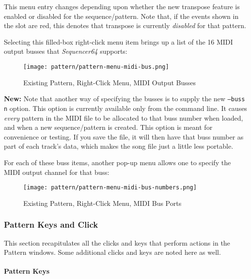    This menu entry changes depending upon whether the new transpose feature is
   enabled or disabled for the sequence/pattern.  Note that, if the events
   shown in the slot are red, this denotes that transpose is currently
   \textsl{disabled} for that pattern.

   Selecting this filled-box right-click menu item brings up a list
   of the 16 MIDI output busses that \textsl{Sequencer64} supports:

\begin{figure}[H]
   \centering 
   \texttt{[image: pattern/pattern-menu-midi-bus.png]}
   \caption{Existing Pattern, Right-Click Menu, MIDI Output Busses}
   \label{fig:pattern_window_right_click_midi_bus}
\end{figure}

   \textbf{New:}
   Note that another way of specifying the busses is to supply the
   new \texttt{--buss n} option.  This option is currently available
   only from the command line.  It causes \textsl{every} pattern in the MIDI
   file to be allocated to that buss number when loaded, and when a new
   sequence/pattern is created.  This option is
   meant for convenience or testing.  If you save the file, it will then
   have that buss number as part of each track's data, which makes the song
   file just a little less portable.

   For each of these buss items, another pop-up menu allows one
   to specify the MIDI output channel for that buss:

\begin{figure}[H]
   \centering 
   \texttt{[image: pattern/pattern-menu-midi-bus-numbers.png]}
   \caption{Existing Pattern, Right-Click Menu, MIDI Bus Ports}
   \label{fig:pattern_window_right_click_midi_bus_numbers}
\end{figure}

\subsubsection{Pattern Keys and Click}
\label{subsubsec:seq64_patterns_pattern_keys_and_clicks}

   This section recapitulates all the clicks and keys that perform actions
   in the Pattern windows.  Some additional clicks and keys are noted here
   as well.

\paragraph{Pattern Keys}
\label{paragraph:seq64_patterns_pattern_keys}

